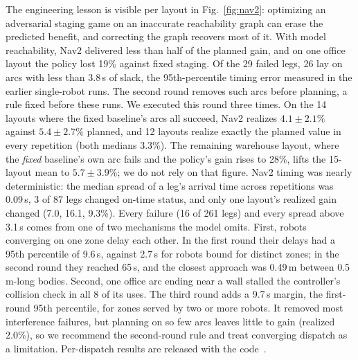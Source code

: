 \documentclass[letterpaper,journal]{IEEEtran}
\theoremstyle{remark}
\begin{document}
The engineering lesson is visible per layout in Fig.~\ref{fig:nav2}: optimizing an adversarial staging game on an inaccurate reachability graph can erase the predicted benefit, and correcting the graph recovers most of it. With model reachability, Nav2 delivered less than half of the planned gain, and on one office layout the policy lost 19\% against fixed staging. Of the 29 failed legs, 26 lay on arcs with less than 3.8\,s of slack, the 95th-percentile timing error measured in the earlier single-robot runs. The second round removes such arcs before planning, a rule fixed before these runs. We executed this round three times. On the 14 layouts where the fixed baseline's arcs all succeed, Nav2 realizes $4.1\pm2.1\%$ against $5.4\pm2.7\%$ planned, and 12 layouts realize exactly the planned value in every repetition (both medians 3.3\%). The remaining warehouse layout, where the \emph{fixed} baseline's own arc fails and the policy's gain rises to 28\%, lifts the 15-layout mean to $5.7\pm3.9\%$; we do not rely on that figure. Nav2 timing was nearly deterministic: the median spread of a leg's arrival time across repetitions was 0.09\,s, 3 of 87 legs changed on-time status, and only one layout's realized gain changed (7.0, 16.1, 9.3\%). Every failure (16 of 261 legs) and every spread above 3.1\,s comes from one of two mechanisms the model omits. First, robots converging on one zone delay each other. In the first round their delays had a 95th percentile of 9.6\,s, against 2.7\,s for robots bound for distinct zones; in the second round they reached 65\,s, and the closest approach was 0.49\,m between 0.5\,m-long bodies. Second, one office arc ending near a wall stalled the controller's collision check in all 8 of its uses. The third round adds a 9.7\,s margin, the first-round 95th percentile, for zones served by two or more robots. It removed most interference failures, but planning on so few arcs leaves little to gain (realized $2.0\%$), so we recommend the second-round rule and treat converging dispatch as a limitation. Per-dispatch results are released with the code~\cite{alam2026code}.
\end{document}
